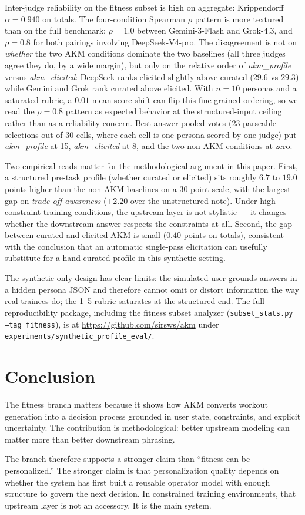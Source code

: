 \documentclass[11pt]{article}
\begin{document}
Inter-judge reliability on the fitness subset is high on aggregate: Krippendorff $\alpha = 0.940$ on totals. The four-condition Spearman $\rho$ pattern is more textured than on the full benchmark: $\rho = 1.0$ between Gemini-3-Flash and Grok-4.3, and $\rho = 0.8$ for both pairings involving DeepSeek-V4-pro. The disagreement is not on \textit{whether} the two AKM conditions dominate the two baselines (all three judges agree they do, by a wide margin), but only on the relative order of \textit{akm\_profile} versus \textit{akm\_elicited}: DeepSeek ranks elicited slightly above curated ($29.6$ vs $29.3$) while Gemini and Grok rank curated above elicited. With $n=10$ personas and a saturated rubric, a $0.01$ mean-score shift can flip this fine-grained ordering, so we read the $\rho = 0.8$ pattern as expected behavior at the structured-input ceiling rather than as a reliability concern. Best-answer pooled votes (23 parseable selections out of 30 cells, where each cell is one persona scored by one judge) put \textit{akm\_profile} at 15, \textit{akm\_elicited} at 8, and the two non-AKM conditions at zero.

Two empirical reads matter for the methodological argument in this paper. First, a structured pre-task profile (whether curated or elicited) sits roughly $6.7$ to $19.0$ points higher than the non-AKM baselines on a 30-point scale, with the largest gap on \emph{trade-off awareness} ($+2.20$ over the unstructured note). Under high-constraint training conditions, the upstream layer is not stylistic --- it changes whether the downstream answer respects the constraints at all. Second, the gap between curated and elicited AKM is small ($0.40$ points on totals), consistent with the conclusion that an automatic single-pass elicitation can usefully substitute for a hand-curated profile in this synthetic setting.

The synthetic-only design has clear limits: the simulated user grounds answers in a hidden persona JSON and therefore cannot omit or distort information the way real trainees do; the 1--5 rubric saturates at the structured end. The full reproducibility package, including the fitness subset analyzer (\texttt{subset\_stats.py --tag fitness}), is at \url{https://github.com/sirsws/akm} under \texttt{experiments/synthetic\_profile\_eval/}.

\section{Conclusion}
The fitness branch matters because it shows how AKM converts workout generation into a decision process grounded in user state, constraints, and explicit uncertainty. The contribution is methodological: better upstream modeling can matter more than better downstream phrasing.

The branch therefore supports a stronger claim than ``fitness can be personalized.'' The stronger claim is that personalization quality depends on whether the system has first built a reusable operator model with enough structure to govern the next decision. In constrained training environments, that upstream layer is not an accessory. It is the main system.


\end{document}
